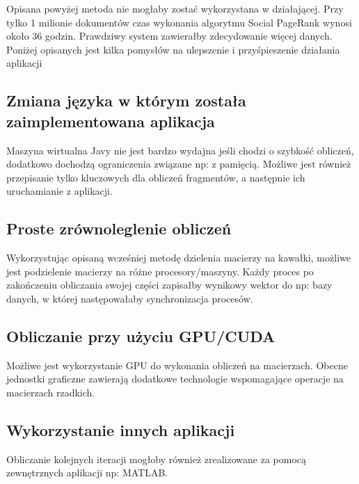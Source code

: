 Opisana powyżej metoda nie mogłaby zostać wykorzystana w działającej. Przy tylko 1 milionie dokumentów czas wykonania algorytmu Social PageRank wynosi około 36 godzin. Prawdziwy system zawierałby zdecydowanie więcej danych. Poniżej opisanych jest kilka  pomysłów na ulepszenie i przyśpieszenie działania aplikacji

\subsection*{Zmiana języka w którym została zaimplementowana aplikacja}
Maszyna wirtualna Javy nie jest bardzo wydajna jeśli chodzi o szybkość obliczeń, dodatkowo dochodzą ograniczenia związane np: z pamięcią. Możliwe jest również przepisanie tylko kluczowych dla obliczeń fragmentów, a następnie ich uruchamianie z aplikacji. 

\subsection*{Proste zrównoleglenie obliczeń}
Wykorzystując opisaną wcześniej metodę dzielenia macierzy na kawałki, możliwe jest podzielenie macierzy na różne procesory/maszyny. Każdy proces po zakończeniu obliczania swojej części zapisałby wynikowy wektor do np: bazy danych, w której następowałaby synchronizacja procesów. 

\subsection*{Obliczanie przy użyciu GPU/CUDA} 

Możliwe jest wykorzystanie GPU do wykonania obliczeń na macierzach. Obecne jednostki graficzne zawierają dodatkowe technologie wspomagające operacje na macierzach rzadkich. 

\subsection*{Wykorzystanie innych aplikacji}

Obliczanie kolejnych iteracji mogłoby również zrealizowane za pomocą zewnętrznych aplikacji np: MATLAB.




